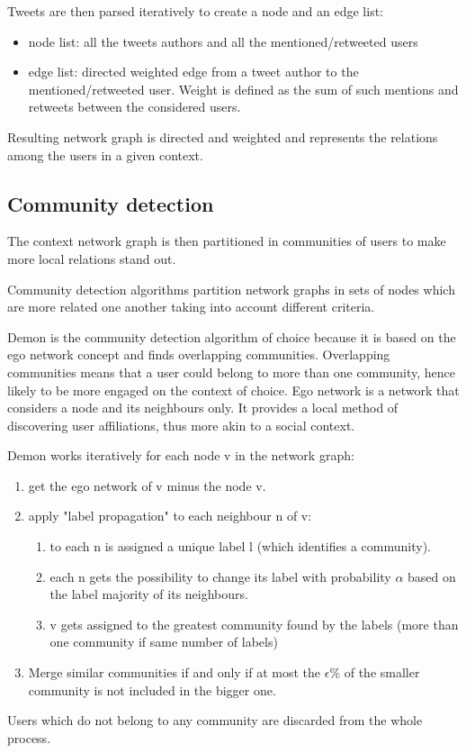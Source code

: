 \documentclass[runningheads]{llncs}
\begin{document}
Tweets are then parsed iteratively to create a node and an edge list:
\begin{itemize}
    \item node list: all the tweets authors and all the mentioned/retweeted users
	\item edge list: directed weighted edge from a tweet author to the mentioned/retweeted user. Weight is defined as the sum of such mentions and retweets between the considered users.
\end{itemize}

Resulting network graph is directed and weighted and represents the relations among the users in a given context.

\subsection{Community detection}  \label{sec:communities}
The context network graph is then partitioned in communities of users to make more local relations stand out.

Community detection algorithms partition network graphs in sets of nodes which are more related one another taking into account different criteria.

Demon  is the community detection algorithm of choice because it is based on the ego network concept and finds overlapping communities. 
Overlapping communities means that a user could belong to more than one community, hence likely to be more engaged on the context of choice.
Ego network is a network that considers a node and its neighbours only. It provides a local method of discovering user affiliations, thus more akin to a social context.

Demon works iteratively for each node v in the network graph:
\begin{enumerate}
    \item get the ego network of v minus the node v.
    \item apply "label propagation"  to each neighbour n of v:
    \begin{enumerate}
        \item to each n is assigned a unique label l (which identifies a community).
        \item each n gets the possibility to change its label with probability $\alpha$ based on the label majority of its neighbours.
        \item v gets assigned to the greatest community found by the labels (more than one community if same number of labels)
    \end{enumerate}
    \item Merge similar communities if and only if at most the $\epsilon \%$ of the smaller community is not included in the bigger one.
\end{enumerate}
Users which do not belong to any community are discarded from the whole process.
\end{document}
